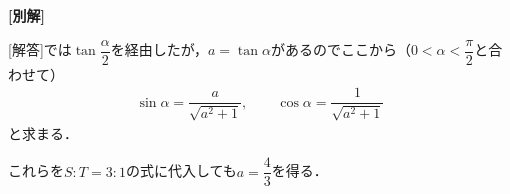 \documentclass[../../main.tex]{subfiles}
\begin{document}
{\bf [別解]}

[解答]では$\tan\dfrac{\alpha}{2}$を経由したが，$a=\tan\alpha$があるのでここから（$0<\alpha<\dfrac{\pi}{2}$と合わせて）
\begin{align}
  \sin\alpha=\dfrac{a}{\sqrt{a^2+1}},\qquad \cos\alpha=\dfrac{1}{\sqrt{a^2+1}}
\end{align}
と求まる．

これらを$S:T=3:1$の式に代入しても$a=\dfrac{4}{3}$を得る．
\end{document}
